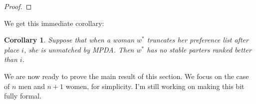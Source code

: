 \documentclass[12pt]{article}
\DeclareMathOperator*{\worst}{worst}
\newtheorem{corollary}[definition]{Corollary}
\begin{document}
\begin{proof}


  \end{proof}

  We get this immediate corollary:
  \begin{corollary}\label{corTruncateOptimal}
    Suppose that when a woman $w^*$ truncates her preference list after place
    $i$, she is unmatched by MPDA.
    Then $w^*$ has no stable parters ranked better than $i$.
  \end{corollary}

  We are now ready to prove the main result of this section.
  We focus on the case of $n$ men and $n+1$ women, for simplicity.
  I'm still working on making this bit fully formal.
\end{document}
